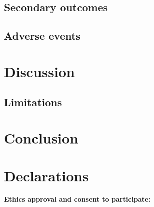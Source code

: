 \documentclass[11pt,a4paper]{article}
\begin{document}
\subsection{Secondary outcomes}

\subsection{Adverse events}

\section{Discussion}
\label{sec:discussion}

\subsection{Limitations}

\section{Conclusion}
\label{sec:conclusion}

\section*{Declarations}

\noindent\textbf{Ethics approval and consent to participate:} %
\end{document}
